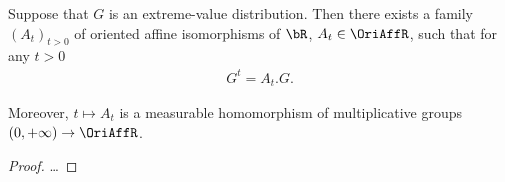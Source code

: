 \begin{lemma}
  \label{lem:self-similarity-of-extreme-value-distributions}
  Suppose that $G$ is an extreme-value distribution.
  Then there exists a family $(A_t)_{t > 0}$ of
  oriented affine isomorphisms of $\bR$, $A_t \in \OriAffR$,
  such that for any $t > 0$
  \begin{align*}
    G^t = A_t . G .
  \end{align*}

  Moreover, $t \mapsto A_t$ is a measurable homomorphism
  of multiplicative groups $(0,+\infty) \to \OriAffR$.
\end{lemma}
\begin{proof}
  \ldots
\end{proof}

%
%
%
%

